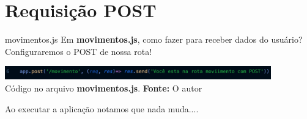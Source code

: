\documentclass{beamer}
\begin{document}
\section{Requisição POST}
    \begin{frame}{movimentos.js}
 	Em \textbf{movimentos.js}, como fazer para receber dados do usuário?\\
	Configuraremos o POST de nossa rota!
        
         \begin{center}
    	\includegraphics[width=115mm]{resources/aula4_12.png}\\
        \tiny{ Código no arquivo \textbf{movimentos.js}. \textbf{Fonte:} O autor}
     \end{center}   
      Ao executar a aplicação notamos que nada muda....
    \end{frame}    
\end{document}
